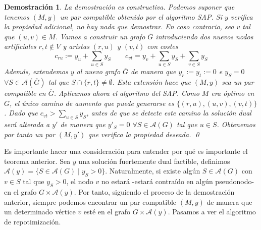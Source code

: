 \documentclass[twoside,a4paper,openright,12pt,tikz]{book}
\newtheorem*{dem}{Demostración}
\begin{document}
\begin{dem}
La demostración es constructiva. Podemos suponer que tenemos $(M,y)$ un par compatible obtenido por el algoritmo SAP. Si $y$ verifica la propiedad adicional, no hay nada que demostrar. En caso contrario, sea $v$ tal que $(u,v)\in M$. Vamos a construir un grafo $\overline{G}$ introduciendo dos nuevos nodos artificiales $r,t\notin V$ y aristas $(r,u)$ y $(v,t)$ con costes 
$$
c_{ru}:= y_u+\sum_{u\in S}y_S \qquad c_{vt} = y_v + \sum_{u\in S}y_S  +\sum_{v\in S}y_S 
$$
Además, extendemos $y$ al nuevo grafo $\overline{G}$ de manera que $y_r:=y_t:=0$ e $y_S = 0$ $\forall S \in \mathcal{A}(\overline{G})$ tal que $S\cap\{r,t\}\neq \emptyset$. Esta extensión hace que $(M,y)$ sea un par compatible en $\overline{G}$. Aplicamos ahora el algoritmo del SAP. Como $M$ era óptimo en $G$, el único camino de aumento que puede generarse es $\{(r,u),(u,v),(v,t)\}$. Dado que $c_{vt}>\sum_{u\in S}y_S$, antes de que se detecte este camino la solución dual será alterada a $y'$ de manera que $y'_S = 0$ $\forall S \in \mathcal{A}(G)$ tal que $u \in S$. Obtenemos por tanto un par $(M,y')$ que verifica la propiedad deseada. \qed
\end{dem}
Es importante hacer una consideración para entender por qué es importante el teorema anterior. Sea $y$ una solución fuertemente dual factible, definimos $\mathcal{A}(y)=\{S\in \mathcal{A}(G)\mid y_S>0\}$. Naturalmente, si existe algún $S \in \mathcal{A}(G)$ con $v\in S$ tal que $y_S >0$, el nodo $v$ no estará -estará contraído en algún pseudonodo- en el grafo $G\times \mathcal{A}(y)$. Por tanto, siguiendo el proceso de la demostración anterior, siempre podemos encontrar un par compatible $(M,y)$ de manera que un determinado vértice $v$ esté en el grafo $G\times \mathcal{A}(y)$. Pasamos a ver el algoritmo de repotimización. 
\end{document}
